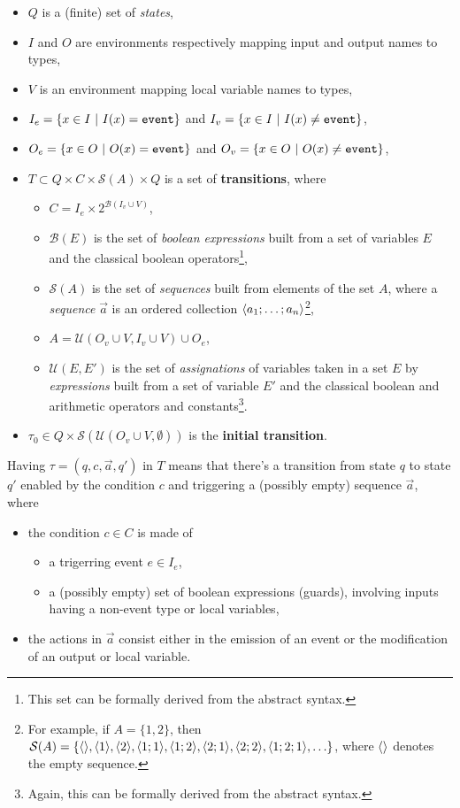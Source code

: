 \begin{itemize}
\item $Q$ is a (finite) set of \emph{states},
\item $I$ and $O$ are environments respectively mapping input and output names to types,
\item $V$ is an environment mapping local variable names to types,
\item $I_e = \{ x \in I ~|~ I(x)=\mathtt{event} \}$ and $I_v = \{ x \in I ~|~ I(x)\not=\mathtt{event} \}$,
\item $O_e = \{ x \in O ~|~ O(x)=\mathtt{event} \}$ and $O_v = \{ x \in O ~|~ O(x)\not=\mathtt{event} \}$,
\item $T \subset Q \times C \times \mathcal{S}(A) \times Q$ is a set of \textbf{transitions}, where
  \begin{itemize}
  \item $C=I_e \times 2^{\mathcal{B}(I_v \cup V)}$,
  \item $\mathcal{B}(E)$ is the set of \emph{boolean expressions} built from a set of variables $E$ and the
  classical boolean operators\footnote{This set can be formally  derived from the abstract syntax.},
  \item $\mathcal{S}(A)$ is the set of \emph{sequences} built from elements of the set $A$, where a
    \emph{sequence} $\vec{a}$ is an ordered collection $\langle a_1;\ldots;a_n\rangle$\footnote{For example, if
      $A=\{1,2\}$, then
      $\mathcal{S}(A)=\{\langle\rangle,\langle1\rangle,\langle2\rangle,\langle1; 1\rangle,\langle1; 2\rangle,\langle2; 1\rangle,\langle2; 2\rangle,\langle1; 2; 1\rangle,\ldots\}$,
      where $\langle\rangle$ denotes the empty sequence.},
  \item $A=\mathcal{U}(O_v \cup V, I_v \cup V) \cup O_e$, 
\item $\mathcal{U}(E,E')$ is the set of
  \emph{assignations} of variables taken in a set $E$ by \emph{expressions} built from a set of
  variable $E'$ and the classical boolean and arithmetic operators and constants\footnote{Again,
this can be formally derived from the abstract syntax.}.
  \end{itemize}
\item $\tau_0 \in Q \times \mathcal{S}({\mathcal{U}(O_v \cup V,\emptyset)})$ is the \textbf{initial transition}.
\end{itemize}

\medskip
Having $\tau=(q,c,\vec{a},q')$ in $T$ means that there's a transition from state $q$ to state
$q'$ enabled by the condition $c$ and triggering a (possibly empty) sequence $\vec{a}$, where
\begin{itemize}
\item the condition $c \in C$ is made of
\begin{itemize}
\item a trigerring event $e \in I_e$,
\item a (possibly empty) set of boolean expressions (guards), involving inputs having a non-event
  type or local variables,
\end{itemize}
\item the actions in $\vec{a}$ consist either in the emission of an event or the modification of an output or
local variable.
\end{itemize}

